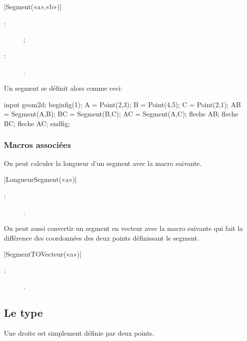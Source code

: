 \documentclass[a4paper,french]{article}
\begin{document}
\begin{colourband}
\macro|Segment(«a»,«b»)|
\begin{description}
  \item[:]   ;
  \item[:]  .
\end{description}
\end{colourband}

\bigskip

Un segment se définit alors comme ceci:
\begin{ExempleMP}
input geom2d;
beginfig(1);
A = Point(2,3);
B = Point(4,5);
C = Point(2,1);
AB = Segment(A,B);
BC = Segment(B,C);
AC = Segment(A,C);
fleche AB;
fleche BC;
fleche AC;
endfig;
\end{ExempleMP}

\subsubsection{Macros associées}

On peut calculer la longueur d'un segment avec la macro suivante.
\begin{colourband}
\macro|LongueurSegment(«a»)|
\begin{description}
  \item[:]  .
\end{description}
\end{colourband}

On peut aussi convertir un segment en vecteur avec la macro suivante qui fait la
différence des coordonnées des deux points définissant le segment.
\begin{colourband}
\macro|SegmentTOVecteur(«a»)|
\begin{description}
  \item[:]  .
\end{description}
\end{colourband}



\subsection{Le type }
Une droite est simplement définie par
deux points.
\end{document}
